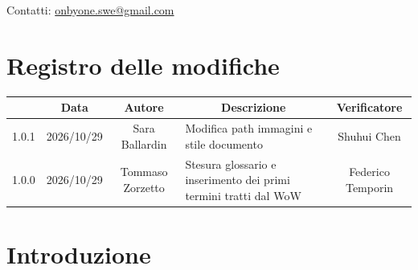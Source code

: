 \documentclass[11pt, a4paper]{article}
\begin{document}
\begin{titlepage}
    \vspace{0.5cm}
    
    {\large Contatti: \href{mailto:onbyone.swe@gmail.com}{onbyone.swe@gmail.com} }
    
\end{titlepage}


\newpage

\section*{Registro delle modifiche}
\vspace{1cm}
\begin{center}
    \renewcommand{\arraystretch}{1.5}
    \begin{tabularx}{\textwidth}{|c|c|c|X|c|}
        \hline
        \rowcolor{gray!10} 
        \multicolumn{1}{|c|}{\textbf{Versione}} & 
        \multicolumn{1}{c|}{\textbf{Data}} & 
        \multicolumn{1}{c|}{\textbf{Autore}} & 
        \multicolumn{1}{c|}{\textbf{Descrizione}} & 
        \multicolumn{1}{c|}{\textbf{Verificatore}} \\
        \hline
        1.0.1 & 2026/10/29 & Sara Ballardin & Modifica path immagini e stile documento & Shuhui Chen \\
        \hline
        1.0.0 & 2026/10/29 & Tommaso Zorzetto & Stesura glossario e inserimento dei primi termini tratti dal WoW & Federico Temporin \\
        \hline
        
    \end{tabularx}
\end{center}


\newpage

\tableofcontents
\newpage

\section{Introduzione}
\end{document}
